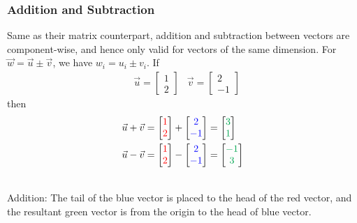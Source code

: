 \subsubsection{Addition and Subtraction}
Same as their matrix counterpart, addition and subtraction between vectors are component-wise, and hence only valid for vectors of the same dimension. For $\vec{w} = \vec{u} \pm \vec{v}$, we have $w_i = u_i \pm v_i$. If
\begin{align*}
&\vec{u} =
\begin{bmatrix}
1 \\
2
\end{bmatrix}
&
\vec{v} =
\begin{bmatrix}
2 \\
-1
\end{bmatrix}
\end{align*}
then
\begin{align*}
\vec{u} + \vec{v} =
\begin{bmatrix}
\textcolor{red}{1} \\
\textcolor{red}{2}
\end{bmatrix}
+
\begin{bmatrix}
\textcolor{blue}{2} \\
\textcolor{blue}{-1}
\end{bmatrix}
&= 
\begin{bmatrix}
\textcolor{Green}{3} \\
\textcolor{Green}{1}
\end{bmatrix}
\\
\vec{u} - \vec{v} =
\begin{bmatrix}
\textcolor{red}{1} \\
\textcolor{red}{2}
\end{bmatrix}
-
\begin{bmatrix}
\textcolor{blue}{2} \\
\textcolor{blue}{-1}
\end{bmatrix}
&= 
\begin{bmatrix}
\textcolor{Green}{-1} \\
\textcolor{Green}{3}
\end{bmatrix}
\end{align*}
\begin{center}
\\
Addition: The tail of the blue vector is placed to the head of the red vector, and the resultant green vector is from the origin to the head of blue vector.
\end{center}
